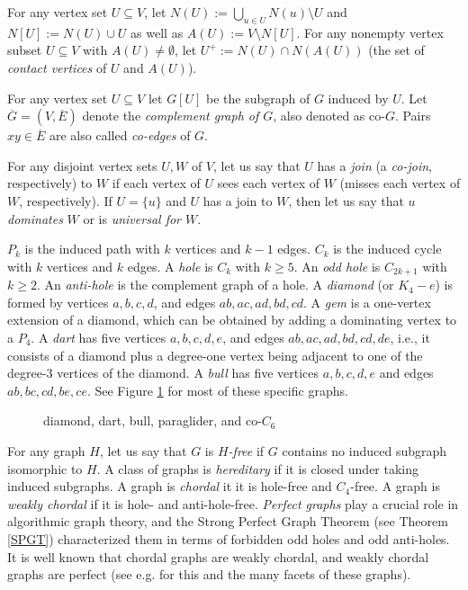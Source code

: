 \documentclass[11pt]{article}
\newcommand{\0}{\text{ has a co-join to }}
\newcommand{\1}{\text{ has a join to }}
\begin{document}
For any vertex set $U \subseteq V$, let $N(U) := \bigcup_{u \in U} N(u) \setminus U$ and $N[U]:=N(U) \cup U$ as well as $A(U):=V \setminus N[U]$.
For any nonempty vertex subset $U \subseteq V$ with $A(U) \neq \emptyset$, let $U^+ := N(U) \cap N(A(U))$ (the set of {\em contact vertices} of $U$ and $A(U)$).

For any vertex set $U \subseteq V$ let $G[U]$ be the subgraph of $G$ induced by $U$. Let $\overline{G}=(V,\overline{E})$ denote the {\em complement graph of $G$}, also denoted as co-$G$. Pairs $xy \in \overline{E}$ are also called {\em co-edges} of $G$. 

For any disjoint vertex sets $U,W$ of $V$, let us say that $U$ has a {\em join} (a {\em co-join}, respectively) to $W$ if each vertex of $U$ sees each vertex of $W$ (misses each vertex of $W$, respectively). If $U = \{u\}$ and $U$ has a join to $W$, then let us say that $u$ {\em dominates} $W$ or is {\em universal for $W$}.

$P_k$ is the induced path with $k$ vertices and $k-1$ edges. $C_k$ is the induced cycle with $k$ vertices and $k$ edges. A {\em hole} is $C_k$ with $k \geq 5$. An 
{\em odd hole} is $C_{2k+1}$ with $k \geq 2$. An {\em anti-hole} is the complement graph of a hole. 
A {\em diamond} (or $K_4-e$) is formed by vertices $a,b,c,d$, and edges $ab,ac,ad,bd,cd$. A {\em gem} is a one-vertex extension of a diamond, which can be obtained by adding  a dominating vertex to a $P_4$.
A {\em dart} has five vertices $a,b,c,d,e$, and edges $ab,ac,ad,bd,cd,de$, i.e., it consists of a diamond plus a degree-one vertex being adjacent to one of the degree-3 vertices of the diamond. A {\em bull} has five vertices $a,b,c,d,e$ and edges $ab,bc,cd,be,ce$. See Figure \ref{dart} for most of these specific graphs. 

\begin{figure}
  \begin{center}
    \caption{diamond, dart, bull, paraglider, and co-$C_6$}
    \label{dart}
  \end{center}
\end{figure}

For any graph $H$, let us say that $G$ is {\em $H$-free} if $G$ contains no induced subgraph isomorphic to $H$. A class of graphs is {\em hereditary} if it is closed under taking induced subgraphs. A graph is {\em chordal} it it is hole-free and $C_4$-free. A graph is {\em weakly chordal} if it is hole- and anti-hole-free.
{\em Perfect graphs} play a crucial role in algorithmic graph theory, and the Strong Perfect Graph Theorem (see Theorem \ref{SPGT}) characterized them in terms of forbidden odd holes and odd anti-holes. It is well known that chordal graphs are weakly chordal, and weakly chordal graphs are perfect (see e.g. \cite{BraLeSpi1999} for this and the many facets of these graphs). 
\end{document}
